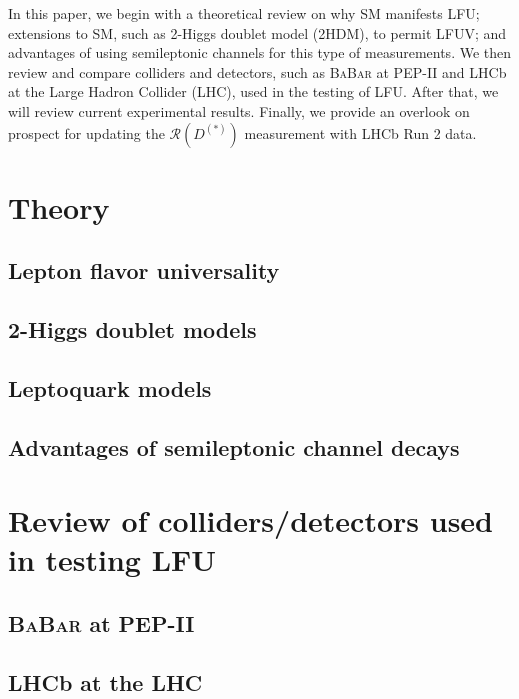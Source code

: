 \documentclass[12pt,letterpaper]{article}
\def\BaBar/{\textsc{BaBar}}
\def\RDDst/{\ensuremath{\mathcal{R}(D^{(*)})}}
\begin{document}
In this paper, we begin with a theoretical review on
why SM manifests LFU;
extensions to SM, such as 2-Higgs doublet model (2HDM), to permit LFUV;
and advantages of using semileptonic channels for this type of measurements.
We then review and compare colliders and detectors, such as \BaBar/ at PEP-II
and LHCb at the Large Hadron Collider (LHC), used in the testing of LFU.
After that, we will review current experimental results.
Finally, we provide an overlook on prospect for updating the $\RDDst/$ measurement with LHCb Run
2 data.

\section{Theory}
\subsection{Lepton flavor universality}


\subsection{2-Higgs doublet models}

\subsection{Leptoquark models}

\subsection{Advantages of semileptonic channel decays}

\section{Review of colliders/detectors used in testing LFU}
\subsection{\BaBar/ at PEP-II}


\subsection{LHCb at the LHC}

\end{document}
